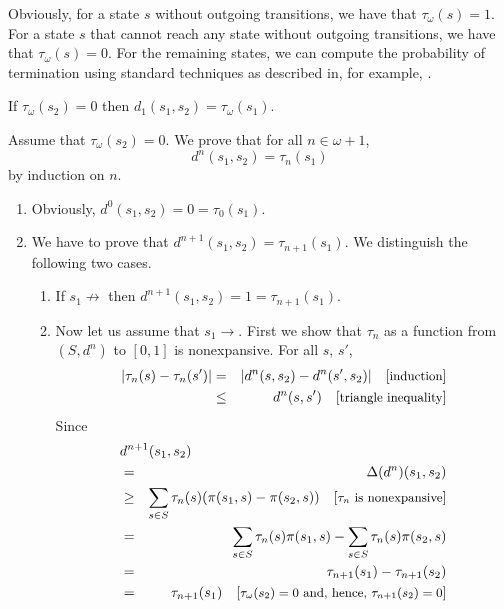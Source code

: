 \documentclass{LMCS}
\newcommand{\comment}[1]{\hspace{1em}\mbox{[{\small #1}]}}
\begin{document}
Obviously, for a state $s$ without outgoing transitions, we have
that $\tau_{\omega}(s) = 1$.  For a state $s$ that cannot reach
any state without outgoing transitions, we have that $\tau_{\omega}(s) = 0$.
For the remaining states, we can compute the probability of termination
using standard techniques as described in, for example, 
\cite[Section~11.2]{GS97}.

\begin{prop}
\label{proposition:7a}
If $\tau_{\omega}(s_2) = 0$ then $d_1(s_1, s_2) = \tau_{\omega}(s_1)$.
\end{prop}
\proof Assume that $\tau_{\omega}(s_2) = 0$.  We prove that for all $n \in \omega + 1$,
\begin{displaymath}
d^n(s_1, s_2) = \tau_n(s_1)
\end{displaymath}
by induction on $n$.
\begin{enumerate}[$\bullet$]
\item
Obviously, $d^0(s_1, s_2) = 0 = \tau_0(s_1)$.
\item
We have to prove that $d^{n+1}(s_1, s_2) = \tau_{n+1}(s_1)$.  We
distinguish the following two cases.
\begin{enumerate}[$-$]
\item
If $s_1 \not\rightarrow$
then $d^{n+1}(s_1, s_2) = 1 = \tau_{n+1}(s_1)$.
\item
Now let us assume that $s_1 \rightarrow$.  First we show that
$\tau_n$ as a function from $(S, d^n)$ to $[0, 1]$ is nonexpansive.
For all $s$, $s'$,
\begin{eqnarray*}
|\tau_n(s) - \tau_n(s')|
& = & | d^n(s, s_2) - d^n(s', s_2) |
\comment{induction}\\
& \leq & d^n(s, s')
\comment{triangle inequality}
\end{eqnarray*}
Since
\begin{eqnarray*}
\lefteqn{d^{n+1}(s_1, s_2)}\\
& = & \Delta(d^n)(s_1, s_2)\\
& \geq & \sum_{s \in S} \tau_n(s) (\pi(s_1, s) - \pi(s_2, s))
\comment{$\tau_n$ is nonexpansive}\\
& = & \sum_{s \in S} \tau_n(s) \pi(s_1, s) - \sum_{s \in S} \tau_n(s) \pi(s_2, s)\\
& = & \tau_{n+1}(s_1) - \tau_{n+1}(s_2)\\
& = & \tau_{n+1}(s_1)
\comment{$\tau_{\omega}(s_2) = 0$ and, hence, $\tau_{n+1}(s_2) = 0$}
\end{eqnarray*}


\end{enumerate}
\end{enumerate}
\end{document}
